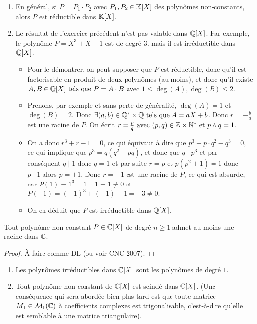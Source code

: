 \documentclass[12pt, a4paper]{report}
\begin{document}
\begin{remark}
    \begin{enumerate}
        \item En général, si $P = P_1 \cdot P_2$ avec $P_1, P_2 \in \mathbb{K}[X]$ des polynômes non-constants, alors $P$ est réductible dans $\mathbb{K}[X]$.
        \item Le résultat de l'exercice précédent n'est pas valable dans $\mathbb{Q}[X]$. Par exemple, le polynôme $P = X^3+X-1$ est de degré $3$, mais il est irréductible dans $\mathbb{Q}[X]$.\\
        \begin{itemize}
            \item Pour le démontrer, on peut supposer que $P$ est réductible, donc qu'il est factorisable en produit de deux polynômes (au moins), et donc qu'il existe $A,B\in\mathbb{Q}[X] \text{ tels que } P = A \cdot B$ avec $1\le \deg(A), \deg(B) \le 2$.
            \item Prenons, par exemple et sans perte de généralité, $\deg(A) = 1$ et $\deg(B) = 2$. Donc $\exists (a,b) \in \mathbb{Q}^*\times\mathbb{Q} \text{ tels que } A = aX+b$. Donc $r= -\frac{b}{a}$ est une racine de $P$. On écrit $r = \frac pq \text{ avec } (p,q)\in\mathbb{Z}\times\mathbb{N}^* \text{ et } p\wedge q = 1$.
            \item On a donc $r^3+r-1=0$, ce qui équivaut à dire que $p^3+p\cdot q^2 - q^3=0$, ce qui implique que $p^3 = q(q^2-pq)$, et donc que $q \mid p^3$ et par conséquent $q\mid 1$ donc $q=1$ et par suite $r=p$ et $p(p^2+1)=1$ donc $p\mid 1$ alors $p=\pm 1$. Donc $r = \pm 1$ est une racine de $P$, ce qui est absurde, car $P(1) = 1^3 + 1 - 1 = 1 \ne 0$ et $P(-1) = (-1)^3 + (-1) - 1 = -3 \ne 0$.
            \item On en déduit que $P$ est irréductible dans $\mathbb{Q}[X]$.
        \end{itemize}
    \end{enumerate}
\end{remark}


\begin{theorem}
    Tout polynôme non-constant $P \in \mathbb{C}[X]$ de degré $n \ge 1$ admet au moins une racine dans $\mathbb{C}$.
\end{theorem}

\begin{proof}
    À faire comme DL (ou voir CNC 2007).
\end{proof}

\begin{consequence}
    \begin{enumerate}
        \item Les polynômes irréductibles dans $\mathbb{C}[X]$ sont les polynômes de degré $1$.
        \item Tout polynôme non-constant de $\mathbb{C}[X]$ est scindé dans $\mathbb{C}[X]$. (Une conséquence qui sera abordée bien plus tard est que toute matrice $M_1 \in \mathcal M_1(\mathbb{C})$ à coefficients complexes est trigonalisable, c'est-à-dire qu'elle est semblable à une matrice triangulaire). 
    \end{enumerate}
\end{consequence}
\end{document}
